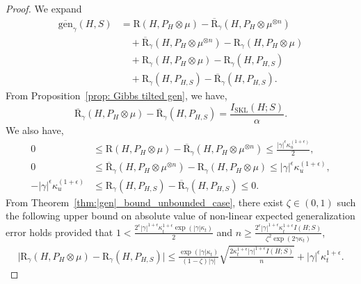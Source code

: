 \documentclass{article}
\theoremstyle{plain}
\theoremstyle{plain}
\theoremstyle{definition}
\theoremstyle{remark}
\newcommand{\RTrue}{\mathrm{R}}
\newcommand{\RTT}{\overline{\mathrm{R}}_{\gamma}}
\newcommand{\RTET}{\mathrm{R}_{\gamma}}
\begin{document}
    \begin{proof}
We expand 
     \begin{equation}\label{eq: decomp exp_u}
           \begin{split}
       \overline{\mathrm{gen}}_{\gamma}(H,S)&= \RTrue(H, P_{H}\otimes \mu) -\RTT(H,P_{H}\otimes \mu^{\otimes n})
        \\&\quad+ \RTT(H,P_{H}\otimes \mu^{\otimes n})-\RTET(H,P_{H}\otimes \mu)
        \\&\quad+\RTET(H,P_{H}\otimes \mu)-\RTET(H,P_{H,S})
        \\&\quad+\RTET(H,P_{H,S})-\RTT(H,P_{H,S}).
        \end{split}
    \end{equation}
    From Proposition~\ref{prop: Gibbs tilted gen}, we have,
    \begin{equation}\label{eq:skl1}
        \RTT(H,P_{H}\otimes \mu)-\RTT(H,P_{H,S})=\frac{ I_{\mathrm{SKL}}(H;S)}{\alpha}.
    \end{equation}
    We also have,
    \begin{equation}\label{eq:I3}
    \begin{split}
    0&\leq\RTrue(H, P_{H}\otimes \mu) -\RTT(H,P_{H}\otimes \mu^{\otimes n})\leq \frac{|\gamma|^{\epsilon}\kappa_u^{(1+\epsilon)}}{2},\\
          0&\leq \RTT(H,P_{H}\otimes \mu^{\otimes n})-\RTET(H,P_{H}\otimes \mu)\leq |\gamma|^{\epsilon}\kappa_u^{(1+\epsilon)},\\
       -|\gamma|^{\epsilon}\kappa_u^{(1+\epsilon)}&\leq\RTET(H,P_{H,S})-\RTT(H,P_{H,S})\leq 0.
    \end{split}
    \end{equation}
    From Theorem~\ref{thm:|gen|_bound_unbounded_case}, there exist $\zeta\in(0,1)$ such the following upper bound on absolute value of non-linear expected generalization error holds provided that $1<\frac{2^{\epsilon}|\gamma|^{1+\epsilon} \kappa_t^{1+\epsilon} \exp(|\gamma|\kappa_t)}{2}$ and $n\geq \frac{2^{\epsilon}|\gamma|^{1+\epsilon} \kappa_t^{1+\epsilon} I(H;S)}{ \zeta^2\exp(2\gamma \kappa_t)}$,
    \begin{equation}\label{eq:I1}
        \begin{split}
         \big|\RTET(H,P_{H}\otimes \mu)-\RTET(H,P_{H,S})\big|\leq       \frac{\exp(|\gamma| \kappa_t)}{(1-\zeta)|\gamma|} \sqrt{\frac{2\kappa_t^{1+\epsilon}|\gamma|^{1+\epsilon} I(H;S)}{n}}+|\gamma|^{\epsilon}\kappa_t^{1+\epsilon}.
        \end{split}
    \end{equation}

\end{proof}
\end{document}
